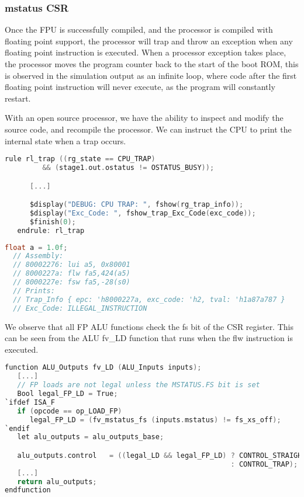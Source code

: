 \documentclass[a4paper,9pt]{report}
\begin{document}
\subsubsection{mstatus CSR}
Once the FPU is successfully compiled, and the processor is compiled with
floating point support, the processor will trap and throw an exception when any
floating point instruction is executed. When a processor exception takes place,
the processor moves the program counter back to the start of the boot ROM, this
is observed in the simulation output as an infinite loop, where code after the
first floating point instruction will never execute, as the program will
constantly restart.

With an open source processor, we have the ability to inspect and modify the source code,
and recompile the processor. We can instruct the CPU to print the internal state
when a trap occurs.

\begin{lstlisting}[language=C,style=customc]
   rule rl_trap ((rg_state == CPU_TRAP)
		 && (stage1.out.ostatus != OSTATUS_BUSY));

      [...]

      $display("DEBUG: CPU TRAP: ", fshow(rg_trap_info));
      $display("Exc_Code: ", fshow_trap_Exc_Code(exc_code));
      $finish(0);
   endrule: rl_trap
\end{lstlisting}
\begin{lstlisting}[language=C,style=customc]
  float a = 1.0f;
  // Assembly:
  // 80002276: lui a5, 0x80001
  // 8000227a: flw fa5,424(a5)
  // 8000227e: fsw fa5,-28(s0)
  // Prints:
  // Trap_Info { epc: 'h8000227a, exc_code: 'h2, tval: 'h1a87a787 }
  // Exc_Code: ILLEGAL_INSTRUCTION
\end{lstlisting}

We observe that all FP ALU functions check the fs bit of the CSR register.
This can be seen from the ALU fv\_LD function that runs when the flw instruction
is executed.
\begin{lstlisting}[language=C,style=customc]
function ALU_Outputs fv_LD (ALU_Inputs inputs);
   [...]
   // FP loads are not legal unless the MSTATUS.FS bit is set
   Bool legal_FP_LD = True;
`ifdef ISA_F
   if (opcode == op_LOAD_FP)
      legal_FP_LD = (fv_mstatus_fs (inputs.mstatus) != fs_xs_off);
`endif
   let alu_outputs = alu_outputs_base;

   alu_outputs.control   = ((legal_LD && legal_FP_LD) ? CONTROL_STRAIGHT
                                                      : CONTROL_TRAP);
   [...]
   return alu_outputs;
endfunction
\end{lstlisting}
\end{document}
